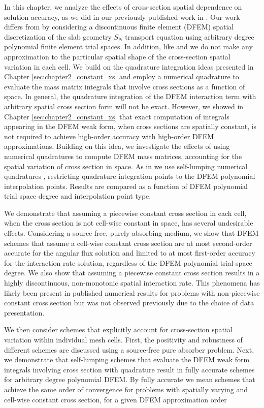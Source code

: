 In this chapter, we analyze the effects of cross-section spatial dependence on solution accuracy, as we did in our previously published work in \cite{part_2_paper}.
Our work differs from \cite{varXS_diff,varXS_MOC,adams_scb,adams_nowak} by considering a discontinuous finite element (DFEM) spatial discretization of the slab geometry $S_N$ transport equation using arbitrary degree polynomial finite element trial spaces.  
In addition, like \cite{adams_scb} and \cite{adams_nowak} we do not make any approximation to the particular spatial shape of the cross-section spatial variation in each cell.
We build on the quadrature integration ideas presented in Chapter \ref{sec:chapter2_constant_xs} and employ a numerical quadrature to evaluate the mass matrix integrals that involve cross sections as a function of space.
In general, the quadrature integration of the DFEM interaction term with arbitrary spatial cross section form will not be exact.
However, we showed in Chapter \ref{sec:chapter2_constant_xs} that exact computation of integrals appearing in the DFEM weak form, when cross sections are spatially constant, is not required to achieve high-order accuracy with high-order DFEM approximations.  
Building on this idea, we investigate the effects of using numerical quadratures to compute DFEM mass matrices, accounting for the spatial variation of cross section in space.
As in  we use self-lumping numerical quadratures \cite{raviart, thomee}, restricting quadrature integration points to the DFEM polynomial interpolation points.
Results are compared as a function of DFEM polynomial trial space degree and interpolation point type.

We demonstrate that assuming a piecewise constant cross section in each cell, when the cross section is not cell-wise constant in space, has several undesirable effects.  
Considering a source-free, purely absorbing medium, we show that DFEM schemes that assume a cell-wise constant cross section are at most second-order accurate for the angular flux solution and limited to at most first-order accuracy for the interaction rate solution, regardless of the DFEM polynomial trial space degree.  
We also show that assuming a piecewise constant cross section results in a highly discontinuous, non-monotonic spatial interaction rate.  
This phenomena has likely been present in published numerical results for problems with non-piecewise constant cross section but was not observed previously due to the choice of data presentation.

We then consider schemes that explicitly account for cross-section spatial variation within individual mesh cells.
First, the positivity and robustness of different schemes are discussed using a source-free pure absorber problem.
Next, we demonstrate that self-lumping schemes that evaluate the DFEM weak form integrals involving cross section with quadrature 
result in fully accurate schemes for arbitrary degree polynomial DFEM. 
By fully accurate we mean schemes that achieve the same order of convergence for problems with spatially varying and cell-wise constant cross section, for a given DFEM approximation order

